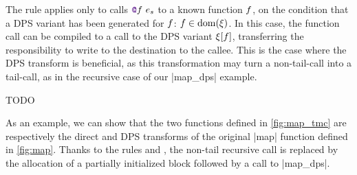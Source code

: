 The rule  applies only to calls $\datalangCall {\datalangFnptr \datalangFn} {\datalangExpr_s}$ to a known function $\datalangFn$, on the condition that a DPS variant has been generated for $\datalangFn$: $\datalangFn \in \dom{\datalangRenaming}$. In this case, the function call can be compiled to a call to the DPS variant $\datalangRenaming [\datalangFn]$, transferring the responsibility to write to the destination to the callee. This is the case where the DPS transform is beneficial, as this transformation may turn a non-tail-call into a tail-call, as in the recursive case of our \ocaml|map_dps| example.

TODO

\medskip

As an example, we can show that the two \DataLang functions defined in \cref{fig:map_tmc} are respectively the direct and DPS transforms of the original \datalang|map| function defined in \cref{fig:map}.
Thanks to the rules  and , the non-tail recursive call is replaced by the allocation of a partially initialized block followed by a call to \datalang|map_dps|.






